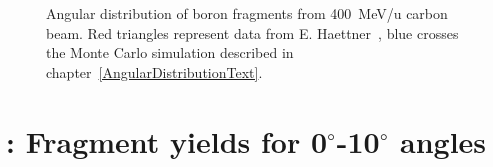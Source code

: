 \begin{figure}[!ht]
{\label{fig:D_31.2_5_N}
}
\label{fig:BoronAD}
\caption[Optional caption for list of figures]{Angular distribution of boron fragments from 400~MeV/u carbon beam. Red triangles represent data from E. Haettner~\cite{ehaettner}, blue crosses the Monte Carlo simulation described in chapter~\ref{AngularDistributionText}.}
\end{figure}
\clearpage


\renewcommand{\theequation}{B\arabic{equation}}
\setcounter{equation}{0}  
\renewcommand{\thefigure}{B\arabic{figure}}
\setcounter{figure}{0}
\renewcommand{\thetable}{B\arabic{table}}
\setcounter{table}{0}
\renewcommand\thesection{B}
\setcounter{section}{1}
\setcounter{subsection}{0}
\section{\label{AppendixB}: Fragment yields for 0$^{\circ}$-10$^{\circ}$ angles}


